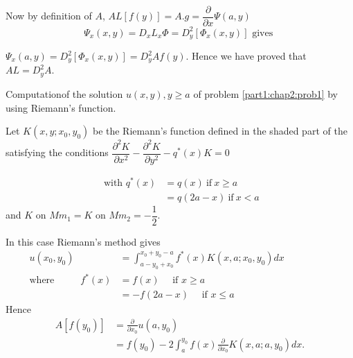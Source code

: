 Now by definition of $A$, $AL[f(y)] = A.g= \dfrac{\partial}{\partial x}
\Psi (a,y)$ 
$$
\Psi_x (x,y) = D_x L_x \Phi = D^2_y [ \Phi_x (x,y)] \text{ gives }
$$

$\Psi_x (a,y) =  D^2_y [ \Phi_x (x,y)] = D^2_y A f(y)$. Hence we have
proved that $A L = D^2_y A$. 

Computation\pageoriginale of the solution $u(x, y), y \geq a$ of
problem \ref{part1:chap2:prob1}  by using Riemann's
function. \label{page16}
\begin{figure}[H]
\end{figure}

Let $K(x, y ; x_0,  y_0)$ be the Riemann's  function defined in the
shaded part of the satisfying the conditions $\dfrac{\partial ^2
  K}{\partial x^2} - \dfrac{\partial^2 K}{\partial y^2} - q^* (x) K =
0$ 

\begin{align*}
  \text{ with } q^* (x) & = q(x) ~\text{if}~ x \geq a\\
  & = q (2 a - x ) ~\text{if}~ x < a 
\end{align*}
and $K$ on $Mm_1 =  K $ on $Mm_2 = - \dfrac{1}{2}$. 

In this case Riemann's method gives 
\begin{align*}
  u (x_0,  y_0) &= \int^{ x_0 + y_0 -a }_{ a - y_0 + x_0} f^* (x) K (x,
  a; x_0, y_0) dx\hspace{2cm}\\
  \text{where } \hspace{1cm} f^* (x) & = f (x) \quad \text{ if } x \geq a \\
  & = - f ( 2a - x ) \quad \text{ if } x \leq a 
\end{align*}
Hence 
\begin{align*}
  A [ f (y_0)] & = \frac{\partial }{\partial
    x_0} u (a, y_0)\\
  & = f (y_0) - 2 \int^{ y_0}_{ a} f (x) \frac{\partial }{\partial x_0} K
  (x, a; a, y_0) dx.    
\end{align*} 

